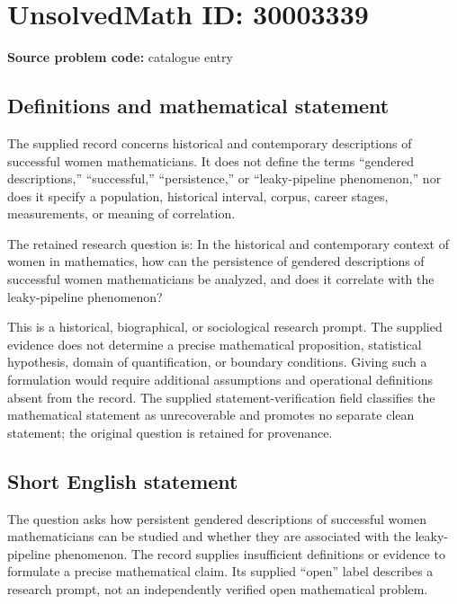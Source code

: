 \documentclass[11pt]{article}
\begin{document}
\section*{UnsolvedMath ID: 30003339}
\textbf{Source problem code:} catalogue entry
\subsection{Definitions and mathematical statement}
The supplied record concerns historical and contemporary descriptions of successful women mathematicians. It does not define the terms ``gendered descriptions,'' ``successful,'' ``persistence,'' or ``leaky-pipeline phenomenon,'' nor does it specify a population, historical interval, corpus, career stages, measurements, or meaning of correlation.

The retained research question is: In the historical and contemporary context of women in mathematics, how can the persistence of gendered descriptions of successful women mathematicians be analyzed, and does it correlate with the leaky-pipeline phenomenon?

This is a historical, biographical, or sociological research prompt. The supplied evidence does not determine a precise mathematical proposition, statistical hypothesis, domain of quantification, or boundary conditions. Giving such a formulation would require additional assumptions and operational definitions absent from the record. The supplied statement-verification field classifies the mathematical statement as unrecoverable and promotes no separate clean statement; the original question is retained for provenance.
\subsection{Short English statement}
The question asks how persistent gendered descriptions of successful women mathematicians can be studied and whether they are associated with the leaky-pipeline phenomenon. The record supplies insufficient definitions or evidence to formulate a precise mathematical claim. Its supplied ``open'' label describes a research prompt, not an independently verified open mathematical problem.
\end{document}
